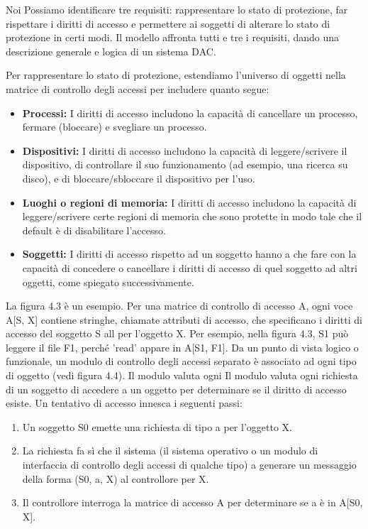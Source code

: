 \singlespacing

Noi Possiamo identificare tre requisiti: rappresentare lo stato di protezione, far rispettare i diritti di accesso e permettere ai soggetti di alterare lo stato di protezione in certi modi. Il modello affronta tutti e tre i requisiti, dando una descrizione generale e logica di un sistema DAC.

\singlespacing

Per rappresentare lo stato di protezione, estendiamo l'universo di oggetti nella matrice di controllo degli accessi per includere quanto segue:
\begin{itemize}
    \item \textbf{Processi:} I diritti di accesso includono la capacità di cancellare un processo, fermare (bloccare) e svegliare un processo.

    \item \textbf{Dispositivi:} I diritti di accesso includono la capacità di leggere/scrivere il dispositivo, di controllare il suo funzionamento (ad esempio, una ricerca su disco), e di bloccare/sbloccare il dispositivo per l'uso.
    
    \item \textbf{Luoghi o regioni di memoria:} I diritti di accesso includono la capacità di leggere/scrivere certe regioni di memoria che sono protette in modo tale che il default è di disabilitare l'accesso.
    
    \item \textbf{Soggetti:} I diritti di accesso rispetto ad un soggetto hanno a che fare con la capacità di concedere o cancellare i diritti di accesso di quel soggetto ad altri oggetti, come spiegato successivamente.
\end{itemize}
La figura 4.3 è un esempio. Per una matrice di controllo di accesso A, ogni voce A[S, X] contiene stringhe, chiamate attributi di accesso, che specificano i diritti di accesso del soggetto S all per l'oggetto X. Per esempio, nella figura 4.3, S1 può leggere il file F1, perché 'read' appare in A[S1, F1]. Da un punto di vista logico o funzionale, un modulo di controllo degli accessi separato è associato ad ogni tipo di oggetto (vedi figura 4.4). Il modulo valuta ogni Il modulo valuta ogni richiesta di un soggetto di accedere a un oggetto per determinare se il diritto di accesso esiste. Un tentativo di accesso innesca i seguenti passi:
\begin{enumerate}
    \item Un soggetto S0 emette una richiesta di tipo a per l'oggetto X.
    
    \item La richiesta fa sì che il sistema (il sistema operativo o un modulo di interfaccia di controllo degli accessi di qualche tipo) a generare un messaggio della forma (S0, a, X) al controllore per X.
    
    \item Il controllore interroga la matrice di accesso A per determinare se a è in A[S0, X].
\end{enumerate}

